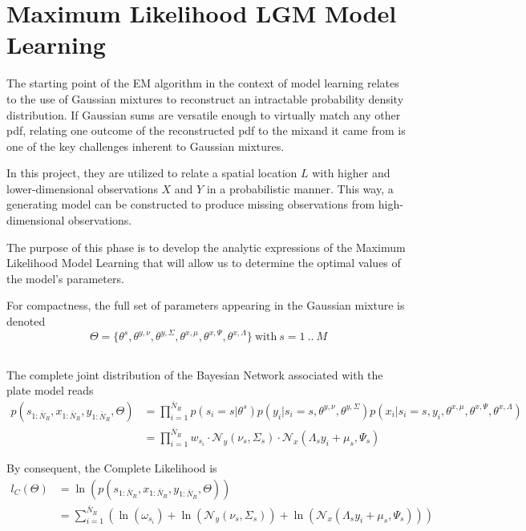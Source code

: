 \section{Maximum Likelihood LGM Model Learning}

The starting point of the EM algorithm in the context of model learning relates to the use of Gaussian mixtures to reconstruct an intractable probability density distribution. If Gaussian sums are versatile enough to virtually match any other pdf, relating one outcome of the reconstructed pdf to the mixand it came from is one of the key challenges inherent to Gaussian mixtures. 

In this project, they are utilized to relate a spatial location $L$ with higher and lower-dimensional observations $X$ and $Y$ in a probabilistic manner. This way, a generating model can be constructed to produce missing observations from high-dimensional observations.

The purpose of this phase is to develop the analytic expressions of the Maximum Likelihood Model Learning that will allow us to determine the optimal values of the model's parameters.

For compactness, the full set of parameters appearing in the Gaussian mixture is denoted
\begin{equation}
\Theta =\{\theta^s,\theta^{y,\nu}, \theta^{y,\Sigma}, \theta^{x,\mu}, \theta^{x,\Psi}, \theta^{x,\Lambda}\}\ \mathrm{with}\ s = 1\ ..\ M
\end{equation}
\subsection{}
The complete joint  distribution of the Bayesian Network associated with the plate model reads
\begin{align}
p(s_{1:\bar{N}_R},x_{1:\bar{N}_R},y_{1:\bar{N}_R},\Theta) &= \prod\limits_{i = 1}^{\bar{N}_R}p(s_i = s\vert\theta^s)
p(y_i\vert s_i = s, \theta^{y,\nu}, \theta^{y,\Sigma})p(x_i\vert s_i = s,y_i, \theta^{x,\mu}, \theta^{x,\Psi}, \theta^{x,\Lambda})
\nonumber \\ &=  \prod\limits_{i = 1}^{\bar{N}_R}w_{s_i}\cdot
\mathcal{N}_y\left(\nu_s,\Sigma_s\right)\cdot\mathcal{N}_x\left(\Lambda_sy_i + \mu_s,\Psi_s\right)
\end{align}

By consequent, the Complete Likelihood is
\begin{align}
l_C(\Theta)& = \ln\left(p(s_{1:\bar{N}_R},x_{1:\bar{N}_R},y_{1:\bar{N}_R},\Theta)\right)\nonumber\\
&= \sum\limits_{i = 1}^{\bar{N}_R}\left(\ln(\omega_{s_i}) + \ln\left(\mathcal{N}_y\left(\nu_s,\Sigma_s\right)\right)+ \ln\left(\mathcal{N}_x\left(\Lambda_sy_i + \mu_s,\Psi_s\right)\right)\right) 
\end{align}

